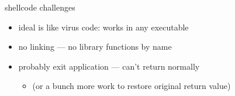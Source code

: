 
\begin{frame}{shellcode challenges}
\begin{itemize}
\item ideal is like virus code: works in any executable
\item no linking --- no library functions by name
\item probably exit application --- can't return normally
    \begin{itemize}
    \item (or a bunch more work to restore original return value)
    \end{itemize}
\end{itemize}
\end{frame}



